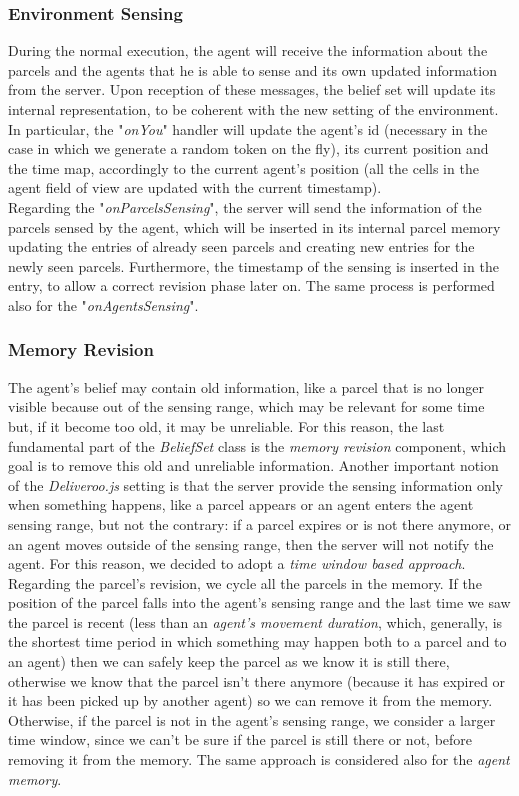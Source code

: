         \subsubsection{Environment Sensing}
            During the normal execution, the agent will receive the information about the parcels and the agents that he is able to sense and its own updated information from the server. Upon reception of these messages, the belief set will update its internal representation, to be coherent with the new setting of the environment.  In particular, the "\textit{onYou}" handler will update the agent's id (necessary in the case in which we generate a random token on the fly), its current position and the time map, accordingly to the current agent's position (all the cells in the agent field of view are updated with the current timestamp).
            \medskip\\
            Regarding the "\textit{onParcelsSensing}", the server will send the information of the parcels sensed by the agent, which will be inserted in its internal parcel memory updating the entries of already seen parcels and creating new entries for the newly seen parcels. Furthermore, the timestamp of the sensing is inserted in the entry, to allow a correct revision phase later on. The same process is performed also for the "\textit{onAgentsSensing}".

        \subsubsection{Memory Revision}
            The agent's belief may contain old information, like a parcel that is no longer visible because out of the sensing range, which may be relevant for some time but, if it become too old, it may be unreliable. For this reason, the last fundamental part of the \textit{BeliefSet} class is the \textit{memory revision} component, which goal is to remove this old and unreliable information. Another important notion of the \textit{Deliveroo.js} setting is that the server provide the sensing information only when something happens, like a parcel appears or an agent enters the agent sensing range, but not the contrary: if a parcel expires or is not there anymore, or an agent moves outside of the sensing range, then the server will not notify the agent. For this reason, we decided to adopt a \textit{time window based approach}.
            \medskip\\
            Regarding the parcel's revision, we cycle all the parcels in the memory. If the position of the parcel falls into the agent's sensing range and the last time we saw the parcel is recent (less than an \textit{agent's movement duration}, which, generally, is the shortest time period in which something may happen both to a parcel and to an agent) then we can safely keep the parcel as we know it is still there, otherwise we know that the parcel isn't there anymore (because it has expired or it has been picked up by another agent) so we can remove it from the memory. Otherwise, if the parcel is not in the agent's sensing range, we consider a larger time window, since we can't be sure if the parcel is still there or not, before removing it from the memory. The same approach is considered also for the \textit{agent memory}.

